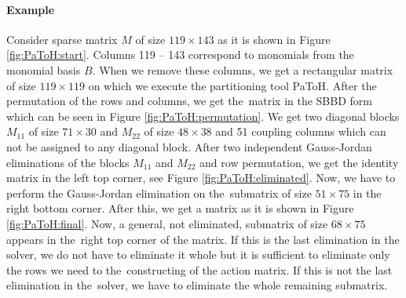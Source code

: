 \paragraph{Example}
Consider sparse matrix $M$ of size $119\times 143$ as it is shown in Figure \ref{fig:PaToH:start}. Columns 119 -- 143 correspond to monomials from the monomial basis $B$. When we remove these columns, we get a rectangular matrix of size $119 \times 119$ on which we execute the partitioning tool PaToH. After the permutation of the rows and columns, we get the~matrix in the SBBD form which can be seen in Figure \ref{fig:PaToH:permutation}. We get two diagonal blocks $M_{11}$ of size $71\times 30$ and $M_{22}$ of size $48 \times 38$ and 51 coupling columns which can not be assigned to any diagonal block. After two independent Gauss-Jordan eliminations of the blocks $M_{11}$ and $M_{22}$ and row permutation, we get the identity matrix in the left top corner, see Figure \ref{fig:PaToH:eliminated}. Now, we have to perform the Gauss-Jordan elimination on the~submatrix of size $51 \times 75$ in the right bottom corner. After this, we get a matrix as it is shown in Figure \ref{fig:PaToH:final}. Now, a general, not eliminated, submatrix of size $68 \times 75$ appears in the~right top corner of the matrix. If this is the last elimination in the solver, we do not have to eliminate it whole but it is sufficient to eliminate only the rows we need to the~constructing of the action matrix. If this is not the last elimination in the~solver, we have to eliminate the whole remaining submatrix.

